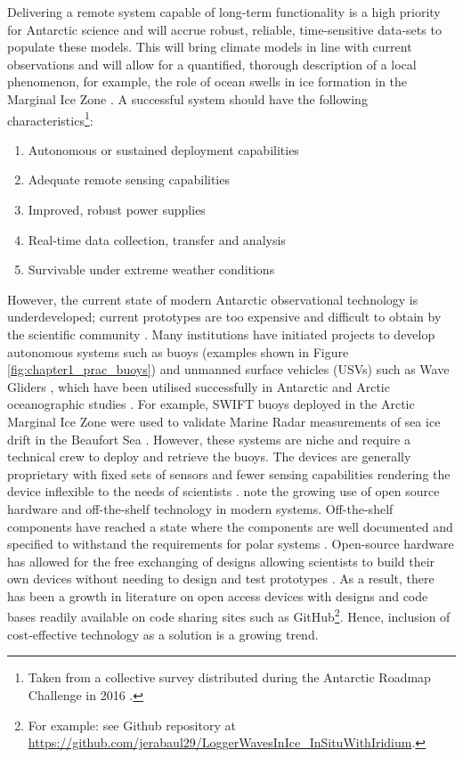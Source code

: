 Delivering a remote system capable of long-term functionality is a high priority for Antarctic science \cite{kennicutt2016delivering} and will accrue robust, reliable, time-sensitive data-sets to populate these models. This will bring climate models in line with current observations and will allow for a quantified, thorough description of a local phenomenon, for example, the role of ocean swells in ice formation in the Marginal Ice Zone \cite{doble2013wave,doble2017robust}. A successful system should have the following characteristics\footnote{Taken from a collective survey distributed during the Antarctic Roadmap Challenge in 2016 \cite{kennicutt2016delivering}.}: 
\begin{enumerate}

    \item Autonomous or sustained deployment capabilities
    \item Adequate remote sensing capabilities
    \item Improved, robust power supplies
    \item Real-time data collection, transfer and analysis
    \item Survivable under extreme weather conditions
\end{enumerate}

However, the current state of  modern Antarctic observational technology is underdeveloped; current prototypes are too expensive and difficult to obtain by the scientific community \cite{kennicutt2016delivering}. Many institutions have initiated projects to develop autonomous systems such as buoys (examples shown in Figure \ref{fig:chapter1_prac_buoys}) and unmanned surface vehicles (USVs) such as Wave Gliders \cite{liquidrobot2016wave}, which  have been utilised successfully in Antarctic and Arctic oceanographic studies \cite{swart2020submesoscale}. For example, SWIFT buoys deployed in the Arctic Marginal Ice Zone were used to validate Marine Radar measurements of sea ice drift in the Beaufort Sea \cite{lund2018Arctic}. However, these systems are niche and require a technical crew to deploy and retrieve the buoys. The devices are generally proprietary with fixed sets of sensors and fewer sensing capabilities rendering the device inflexible to the needs of scientists \cite{rabault2017measurements}. \textcite{rabault2019open} note the growing use of open source hardware and off-the-shelf technology in modern systems. Off-the-shelf  components have reached a state where the components are well documented and specified to withstand the requirements for polar systems \cite{rabault2019open}. Open-source hardware has allowed for the free exchanging of designs allowing scientists to build their own devices without needing to design and test prototypes \cite{rabault2019open}. As a result, there has been a growth in literature on open access devices with designs and code bases readily available on code sharing sites such as GitHub\footnote{For example: see \textcite{rabault2019open} Github repository at \url{https://github.com/jerabaul29/LoggerWavesInIce_InSituWithIridium}.}. Hence, inclusion of cost-effective technology as a solution is a growing trend. \par 

